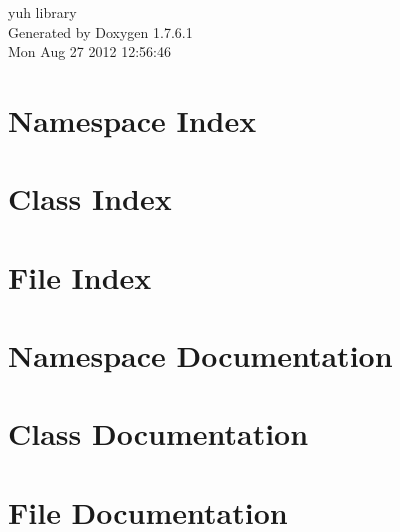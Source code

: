 \documentclass[a4paper]{book}
\begin{document}
\hypersetup{pageanchor=false,citecolor=blue}
\begin{titlepage}
\vspace*{7cm}
\begin{center}
{\Large yuh library }\\
\vspace*{1cm}
{\large \-Generated by Doxygen 1.7.6.1}\\
\vspace*{0.5cm}
{\small Mon Aug 27 2012 12:56:46}\\
\end{center}
\end{titlepage}
\clearemptydoublepage
{}
\tableofcontents
\clearemptydoublepage
{}
\hypersetup{pageanchor=true,citecolor=blue}
\chapter{\-Namespace \-Index}

\chapter{\-Class \-Index}

\chapter{\-File \-Index}

\chapter{\-Namespace \-Documentation}



\chapter{\-Class \-Documentation}














\chapter{\-File \-Documentation}











\printindex
\end{document}

